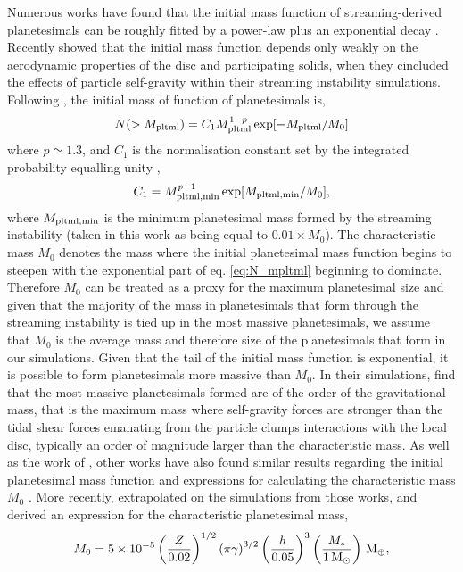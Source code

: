 \documentclass[a4paper,fleqn,usenatbib]{mnras}
\newcommand{\me}{{\, {\rm M}_{\oplus}}}
\newcommand{\msun}{{\, {\rm M}_{\odot}}}
\begin{document}
Numerous works have found that the initial mass function of streaming-derived planetesimals can be roughly fitted by a power-law plus an exponential decay \citep{Johansen15,Schafer17,Abod19}.
Recently \citet{Abod19} showed that the initial mass function depends only weakly on the aerodynamic properties of the disc and participating solids, when they cincluded the effects of particle self-gravity within their streaming instability simulations.
Following \citet{Abod19}, the initial mass of function of planetesimals is,
\begin{equation}
\label{eq:N_mpltml}
N(>M_{\rm pltml}) = C_1 M_{\rm pltml}^{1-p} \exp[-M_{\rm pltml}/M_0]
\end{equation}
where $p \simeq 1.3$, and $C_1$ is the normalisation constant set by the integrated probability equalling unity \citep{Meerschaert12},
\begin{equation}
    C_1 = M_{\rm pltml, min}^{p-1}\exp[{M_{\rm pltml, min}/M_0}], 
\end{equation}
where $M_{\rm pltml, min}$ is the minimum planetesimal mass formed by the streaming instability (taken in this work as being equal to $0.01\times M_0$).
The characteristic mass $M_0$ denotes the mass where the initial planetesimal mass function begins to steepen with the exponential part of eq. \ref{eq:N_mpltml} beginning to dominate.
Therefore $M_0$ can be treated as a proxy for the maximum planetesimal size and given that the majority of the mass in planetesimals that form through the streaming instability is tied up in the most massive planetesimals, we assume that $M_0$ is the average mass and therefore size of the planetesimals that form in our simulations.
Given that the tail of the initial mass function is exponential, it is possible to form planetesimals more massive than $M_0$.
In their simulations, \citet{Abod19} find that the most massive planetesimals formed are of the order of the gravitational mass, that is the maximum mass where self-gravity forces are stronger than the tidal shear forces emanating from the particle clumps interactions with the local disc, typically an order of magnitude larger than the characteristic mass.
As well as the work of \citet{Abod19}, other works have also found similar results regarding the initial planetesimal mass function and expressions for calculating the characteristic mass $M_0$ \citep{Johansen15,Schafer17,Simon16,Li19}.
More recently, \citet{Liu20} extrapolated on the simulations from those works, and derived an expression for the characteristic planetesimal mass,
\begin{equation}
\label{eq:MG_Liu}
M_0 = 5\times 10^{-5}\left(\frac{Z}{0.02}\right)^{1/2}\left(\pi\gamma\right)^{3/2}\left(\frac{h}{0.05}\right)^3\left(\frac{M_*}{1\msun}\right)\me,
\end{equation}
\end{document}
